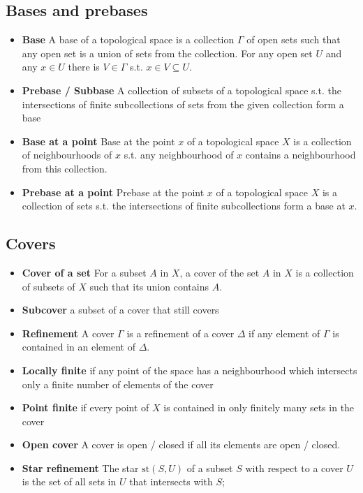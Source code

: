 \documentclass{article}
\begin{document}
\subsection{Bases and prebases}
\begin{itemize}
\item \textbf{Base} A base of a topological space is a collection \(\Gamma\) of open sets such that any open set is a union of sets from the collection.
For any open set \(U\) and any \(x\in U\) there is \(V\in\Gamma\) s.t. \(x\in V\subseteq U\).
\item \textbf{Prebase / Subbase} A collection of subsets of a topological space s.t. the intersections of finite subcollections of sets from the given collection form a base
\item \textbf{Base at a point} Base at the point \(x\) of a topological space \(X\) is a collection of neighbourhoods of \(x\) s.t. any neighbourhood of \(x\) contains a neighbourhood from this collection.
\item \textbf{Prebase at a point} Prebase at the point \(x\) of a topological space \(X\) is a collection of sets s.t. the intersections of finite subcollections form a base at \(x\).
\end{itemize}
\subsection{Covers}
\begin{itemize}
\item \textbf{Cover of a set} For a subset \(A\) in \(X\), a cover of the set \(A\) in \(X\) is a collection of subsets of \(X\) such that its union contains \(A\).
\item \textbf{Subcover} a subset of a cover that still covers
\item \textbf{Refinement} A cover \(\Gamma\) is a refinement of a cover \(\Delta\) if any element of \(\Gamma\) is contained in an element of \(\Delta\).
\item \textbf{Locally finite} if any point of the space has a neighbourhood which intersects only a finite number of elements of the cover
\item \textbf{Point finite} if every point of \(X\) is contained in only finitely many sets in the cover
\item \textbf{Open cover} A cover is open / closed if all its elements are open / closed.
\item \textbf{Star refinement} The star \(\text{st}(S,U)\) of a subset \(S\) with respect to a cover \(U\) is the set of all sets in \(U\) that intersects with \(S\);
\end{itemize}
\end{document}

